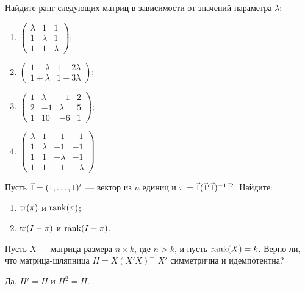 \begin{problem}
Найдите ранг следующих матриц в зависимости от значений параметра $\lambda$:

\begin{enumerate}
\item $\begin{pmatrix} \lambda & 1 & 1 \\ 1 & \lambda & 1 \\ 1 & 1 & \lambda \end{pmatrix}$;
\item $\begin{pmatrix} 1-\lambda & 1-2\lambda \\ 1+\lambda & 1+3\lambda \end{pmatrix}$;
\item $\begin{pmatrix} 1 & \lambda & -1 & 2 \\ 2 & -1 & \lambda & 5 \\ 1 & 10 & -6 & 1 \end{pmatrix}$;
\item $\begin{pmatrix} \lambda & 1 & -1 & -1 \\ 1 & \lambda & -1 & -1 \\ 1 & 1 & -\lambda & -1
\\ 1 & 1 & -1 & -\lambda \end{pmatrix}$.
\end{enumerate}



\begin{sol}
\end{sol}
\end{problem}




\begin{problem}
Пусть $\v1 = (1,\dots,1)'$ — вектор из $n$ единиц и $\pi=\v1(\v1'\v1)^{-1}\v1'$. Найдите:
\begin{enumerate}
\item $\operatorname{tr}(\pi)$ и $\operatorname{rank}(\pi)$;
\item $\operatorname{tr}(I-\pi)$ и $\operatorname{rank}(I-\pi)$.
\end{enumerate}


\begin{sol}
\end{sol}
\end{problem}


\begin{problem}
Пусть $X$ — матрица размера ${n \times k}$, где $n > k$, и пусть $\operatorname{rank}(X) = k$. Верно ли, что матрица-шляпница $H = X(X'X)^{-1}X'$ симметрична и идемпотентна?


\begin{sol}
Да, $H'=H$ и $H^2=H$.
\end{sol}
\end{problem}



